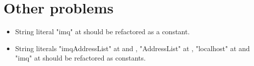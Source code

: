 \chapter{Other problems}
\begin{itemize}
	\item String literal "imq" at  should be refactored as a constant.	
	\item String literals "imqAddressList" at  and , "AddressList" at , "localhost" at  and "imq" at  should be refactored as constants. 
\end{itemize}
	 
